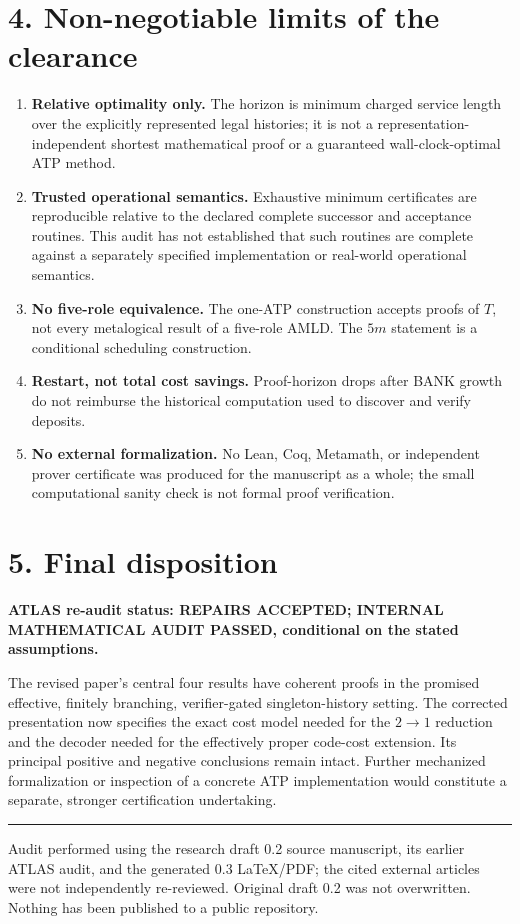 \documentclass[11pt,letterpaper]{article}
\begin{document}
\section*{4. Non-negotiable limits of the clearance}
\begin{enumerate}
\item \textbf{Relative optimality only.} The horizon is minimum charged service length over the explicitly represented legal histories; it is not a representation-independent shortest mathematical proof or a guaranteed wall-clock-optimal ATP method.
\item \textbf{Trusted operational semantics.} Exhaustive minimum certificates are reproducible relative to the declared complete successor and acceptance routines. This audit has not established that such routines are complete against a separately specified implementation or real-world operational semantics.
\item \textbf{No five-role equivalence.} The one-ATP construction accepts proofs of $T$, not every metalogical result of a five-role AMLD. The $5m$ statement is a conditional scheduling construction.
\item \textbf{Restart, not total cost savings.} Proof-horizon drops after BANK growth do not reimburse the historical computation used to discover and verify deposits.
\item \textbf{No external formalization.} No Lean, Coq, Metamath, or independent prover certificate was produced for the manuscript as a whole; the small computational sanity check is not formal proof verification.
\end{enumerate}

\section*{5. Final disposition}
\textbf{ATLAS re-audit status: REPAIRS ACCEPTED; INTERNAL MATHEMATICAL AUDIT PASSED, conditional on the stated assumptions.}

The revised paper's central four results have coherent proofs in the promised effective, finitely branching, verifier-gated singleton-history setting. The corrected presentation now specifies the exact cost model needed for the $2\to1$ reduction and the decoder needed for the effectively proper code-cost extension. Its principal positive and negative conclusions remain intact. Further mechanized formalization or inspection of a concrete ATP implementation would constitute a separate, stronger certification undertaking.

\vspace{2pt}\hrule\vspace{2pt}
{\footnotesize Audit performed using the research draft 0.2 source manuscript, its earlier ATLAS audit, and the generated 0.3 LaTeX/PDF; the cited external articles were not independently re-reviewed. Original draft 0.2 was not overwritten. Nothing has been published to a public repository.}
\end{document}
